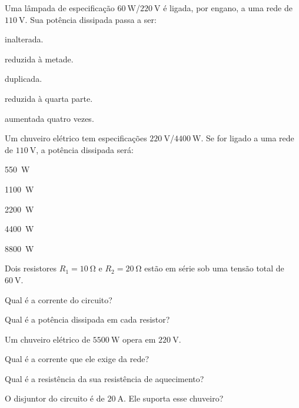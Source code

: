 \blocoaplicacao
\begin{questao}[2]{}

Uma lâmpada de especificação $\SI{60}{\watt}$/$\SI{220}{\volt}$ é ligada, por
engano, a uma rede de $\SI{110}{\volt}$. Sua potência dissipada passa a ser:
\begin{alternativas}
\item inalterada.
\item reduzida à metade.
\item duplicada.
\item reduzida à quarta parte.
\item aumentada quatro vezes.
\end{alternativas}


\end{questao}
\begin{questao}[2]{}

Um chuveiro elétrico tem especificações $\SI{220}{\volt}$/$\SI{4400}{\watt}$. Se
for ligado a uma rede de $\SI{110}{\volt}$, a potência dissipada será:
\begin{alternativas}[2]
\item \SI{550}{\watt}
\item \SI{1100}{\watt}
\item \SI{2200}{\watt}
\item \SI{4400}{\watt}
\item \SI{8800}{\watt}
\end{alternativas}


\end{questao}
\begin{questao}[2]{}

Dois resistores $R_1 = \SI{10}{\ohm}$ e $R_2 = \SI{20}{\ohm}$ estão em série sob
uma tensão total de $\SI{60}{\volt}$.
\begin{itensq}
\item Qual é a corrente do circuito?
\item Qual é a potência dissipada em cada resistor?
\end{itensq}


\end{questao}
\begin{questao}[2]{}

Um chuveiro elétrico de $\SI{5500}{\watt}$ opera em $\SI{220}{\volt}$.
\begin{itensq}
\item Qual é a corrente que ele exige da rede?
\item Qual é a resistência da sua resistência de aquecimento?
\item O disjuntor do circuito é de $\SI{20}{\ampere}$. Ele suporta esse chuveiro?
\end{itensq}


\end{questao}
